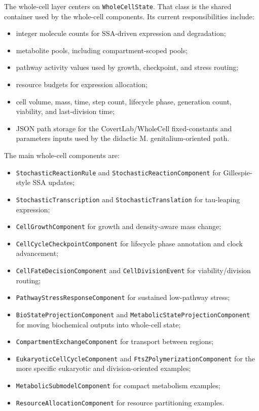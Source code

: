 The whole-cell layer centers on \texttt{WholeCellState}. That class is the
shared container used by the whole-cell components. Its current responsibilities
include:
\begin{itemize}
\item integer molecule counts for SSA-driven expression and degradation;
\item metabolite pools, including compartment-scoped pools;
\item pathway activity values used by growth, checkpoint, and stress routing;
\item resource budgets for expression allocation;
\item cell volume, mass, time, step count, lifecycle phase, generation count,
      viability, and last-division time;
\item JSON path storage for the CovertLab/WholeCell fixed-constants and
      parameters inputs used by the didactic M. genitalium-oriented path.
\end{itemize}

The main whole-cell components are:
\begin{itemize}
\item \texttt{StochasticReactionRule} and \texttt{StochasticReactionComponent}
      for Gillespie-style SSA updates;
\item \texttt{StochasticTranscription} and \texttt{StochasticTranslation} for
      tau-leaping expression;
\item \texttt{CellGrowthComponent} for growth and density-aware mass change;
\item \texttt{CellCycleCheckpointComponent} for lifecycle phase annotation and
      clock advancement;
\item \texttt{CellFateDecisionComponent} and \texttt{CellDivisionEvent} for
      viability/division routing;
\item \texttt{PathwayStressResponseComponent} for sustained low-pathway stress;
\item \texttt{BioStateProjectionComponent} and
      \texttt{MetabolicStateProjectionComponent} for moving biochemical outputs
      into whole-cell state;
\item \texttt{CompartmentExchangeComponent} for transport between regions;
\item \texttt{EukaryoticCellCycleComponent} and \texttt{FtsZPolymerizationComponent}
      for the more specific eukaryotic and division-oriented examples;
\item \texttt{MetabolicSubmodelComponent} for compact metabolism examples;
\item \texttt{ResourceAllocationComponent} for resource partitioning examples.
\end{itemize}

